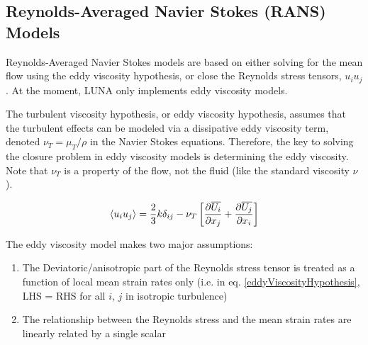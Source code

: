 \subsection{Reynolds-Averaged Navier Stokes (RANS) Models}

Reynolds-Averaged Navier Stokes models are based on either solving for the mean flow using the eddy viscosity hypothesis, or close the Reynolds stress tensors, $u_iu_j$. At the moment, LUNA only implements eddy viscosity models. 

The turbulent viscosity hypothesis, or eddy viscosity hypothesis, assumes that the turbulent effects can be modeled via a dissipative eddy viscosity term, denoted $\nu_T = \mu_T / \rho$ in the Navier Stokes equations. Therefore, the key to solving the closure problem in eddy viscosity models is determining the eddy viscosity. Note that $\nu_T$ is a property of the flow, not the fluid (like the standard viscosity $\nu$).

\begin{equation}
\langle u_i u_j \rangle = \frac{2}{3} k \delta_{ij} - \nu_T \left[ \pdv{\overline{U_i}}{x_j} + \pdv{\overline{U_j}}{x_i} \right]  \label{eddyViscosityHypothesis}
\end{equation}

The eddy viscosity model makes two major assumptions:

\begin{enumerate}
\item The Deviatoric/anisotropic part of the Reynolds stress tensor is treated as a function of local mean strain rates only (i.e. in eq. \ref{eddyViscosityHypothesis}, LHS = RHS for all $i$, $j$ in isotropic turbulence)
\item The relationship between the Reynolds stress and the mean strain rates are linearly related by a single scalar
\end{enumerate}


